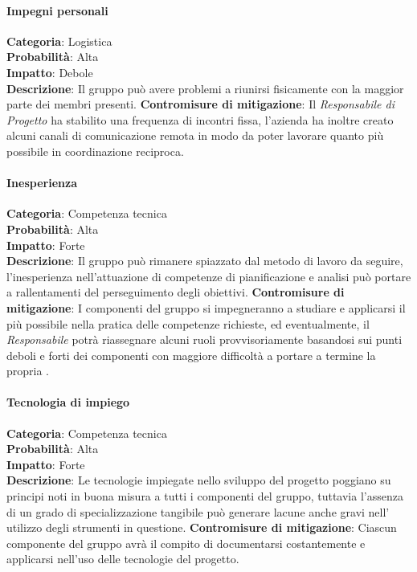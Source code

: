 \documentclass{scalatekids-article}
\begin{document}
\paragraph{Impegni personali}
\textbf{Categoria}: Logistica\\
\textbf{Probabilità}: Alta\\
\textbf{Impatto}: Debole\\
\textbf{Descrizione}: Il gruppo può avere problemi a riunirsi fisicamente con la maggior parte dei membri presenti.
\textbf{Contromisure di mitigazione}: Il \textit{Responsabile di Progetto} ha stabilito una frequenza di incontri fissa,
l'azienda ha inoltre creato alcuni canali di comunicazione remota in modo da poter lavorare quanto più possibile in
coordinazione reciproca.
\paragraph{Inesperienza}
\textbf{Categoria}: Competenza tecnica\\
\textbf{Probabilità}: Alta\\
\textbf{Impatto}: Forte\\
\textbf{Descrizione}: Il gruppo può rimanere spiazzato dal metodo di lavoro da seguire, l'inesperienza nell'attuazione
di competenze di pianificazione e analisi può portare a rallentamenti del perseguimento degli obiettivi.
\textbf{Contromisure di mitigazione}: I componenti del gruppo si impegneranno a studiare e applicarsi il più possibile
nella pratica delle competenze richieste, ed eventualmente, il \textit{Responsabile} potrà riassegnare alcuni ruoli provvisoriamente
basandosi sui punti deboli e forti dei componenti con maggiore difficoltà a portare a termine la propria .
\paragraph{Tecnologia di impiego}
\textbf{Categoria}: Competenza tecnica\\
\textbf{Probabilità}: Alta\\
\textbf{Impatto}: Forte\\
\textbf{Descrizione}: Le tecnologie impiegate nello sviluppo del progetto poggiano su principi noti in buona misura a tutti
i componenti del gruppo, tuttavia l'assenza di un grado di specializzazione tangibile può generare lacune anche gravi nell' utilizzo
degli strumenti in questione.
\textbf{Contromisure di mitigazione}: Ciascun componente del gruppo avrà il compito di documentarsi costantemente e applicarsi
nell'uso delle tecnologie del progetto.
\end{document}
